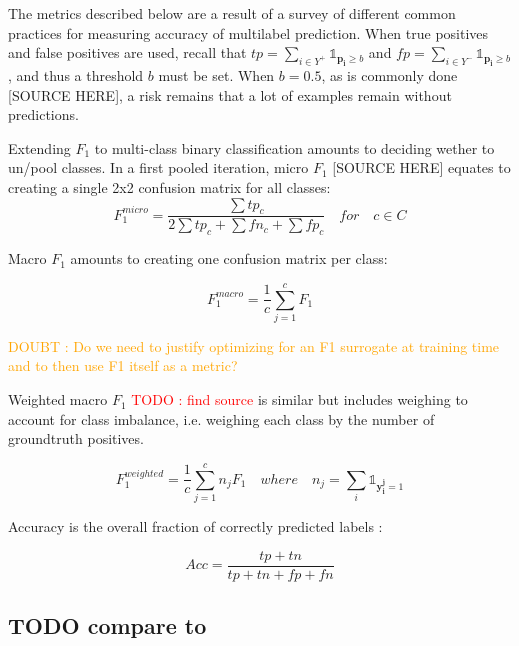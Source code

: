 \documentclass[sigconf,natbib,screen=true,review=true,anonymous]{acmart}
\newcommand\todo[1]{\textcolor{red}{TODO : #1}}
\newcommand\doubt[1]{\textcolor{orange}{DOUBT : #1}}
\begin{document}
The metrics described below are a result of a survey of different common practices for measuring accuracy of multilabel prediction. When true positives and false positives are used, recall that \(t p=\sum_{i \in Y^{+}} \mathds{1}_{\mathbf{p_i} \geq b}\) and \(f p=\sum_{i \in Y^{-}} \mathds{1}_{\mathbf{p_i} \geq b}\), and thus a threshold \(b\) must be set. When \(b = 0.5\), as is commonly done [SOURCE HERE], a risk remains that a lot of examples remain without predictions.

Extending \(F_1\) to multi-class binary classification amounts to deciding wether to un/pool classes.
In a first pooled iteration, micro \(F_1\) [SOURCE HERE] equates to creating a single 2x2 confusion matrix for all classes:
$$F_1^{micro} = \frac{\sum tp_c}{2 \sum tp_c + \sum fn_c + \sum fp_c} \quad for \quad c \in C$$

Macro \(F_1\) \cite{threshForF1} amounts to creating one confusion matrix per class:

$$F_1^{macro} = \frac{1}{c} \sum_{j=1}^c F_1$$

\doubt{Do we need to justify optimizing for an F1 surrogate at training time and to then use F1 itself as a metric?}

Weighted macro \(F_1\) \todo{find source} is similar but includes weighing to account for class imbalance, i.e. weighing each class by the number of groundtruth positives.

$$F_1^{weighted} = \frac{1}{c} \sum_{j=1}^c n_j F_1 \quad where \quad n_j = \sum_i \mathds{1}_{\mathbf{y_i^j} = 1}$$


Accuracy is the overall fraction of correctly predicted labels \cite{threshForF1}:

$$
A c c=\frac{t p+t n}{t p+t n+f p+f n}
$$




\subsection*{{\color{red}\bfseries\sffamily TODO} compare to  \cite{lossComp}}
\label{sec:org5c36a5a}
\clearpage
\end{document}
